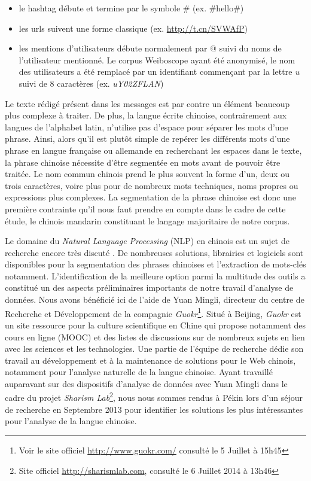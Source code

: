     \begin{itemize}
     \item le hashtag débute et termine par le symbole \# (ex. \#hello\#)
     \item les urls suivent une forme classique (ex. \url{http://t.cn/SVWAfP}) 
     \item les mentions d'utilisateurs débute normalement par $@$ suivi du noms de l'utilisateur mentionné. Le corpus Weiboscope ayant été anonymisé, le nom des utilisateurs a été remplacé par un identifiant commençant par la lettre \textit{u} suivi de 8 caractères (ex. \textit{uY02ZFLAN})
    \end{itemize}

    Le texte rédigé présent dans les messages est par contre un élément beaucoup plus complexe à traiter. De plus, la langue écrite chinoise, contrairement aux langues de l'alphabet latin, n'utilise pas d'espace pour séparer les mots d'une phrase. Ainsi, alors qu'il est plutôt simple de repérer les différents mots d'une phrase en langue française ou allemande en recherchant les espaces dans le texte, la phrase chinoise nécessite d'être segmentée en mots avant de pouvoir être traitée. Le nom commun chinois prend le plus souvent la forme d'un, deux ou trois caractères, voire plus pour de nombreux mots techniques, noms propres ou expressions plus complexes. La segmentation de la phrase chinoise est donc une  première contrainte qu'il nous faut prendre en compte dans le cadre de cette étude, le chinois mandarin constituant le langage majoritaire de notre corpus. 

    Le domaine du \textit{Natural Language Processing} (NLP) en chinois est un sujet de recherche encore très discuté \citep{Qiu2013}. De nombreuses solutions, librairies et logiciels sont disponibles pour la segmentation des phrases chinoises et l'extraction de mots-clés notamment. L{\textquoteright}identification de la meilleure option parmi la multitude des outils a constitué un des aspects préliminaires importants de notre travail d{\textquoteright}analyse de données. Nous avons bénéficié ici de l'aide de Yuan Mingli, directeur du centre de Recherche et Développement de la compagnie \textit{Guokr}\footnote{Voir le site officiel \url{http://www.guokr.com/} consulté le 5 Juillet à 15h45}. Situé à Beijing, \textit{Guokr} est un site ressource pour la culture scientifique en Chine qui propose notamment des cours en ligne (MOOC) et des listes de discussions sur de nombreux sujets en lien avec les sciences et les technologies. Une partie de l'équipe de recherche dédie son travail au développement et à la maintenance de solutions pour le Web chinois, notamment pour l'analyse naturelle de la langue chinoise. Ayant travaillé auparavant sur des dispositifs d'analyse de données avec Yuan Mingli dans le cadre du projet \textit{Sharism Lab}\footnote{Site officiel \url{http://sharismlab.com}, consulté le 6 Juillet 2014 à 13h46}, nous nous sommes rendus à Pékin lors d'un séjour de recherche en Septembre 2013 pour identifier les solutions les plus intéressantes pour l'analyse de la langue chinoise.

